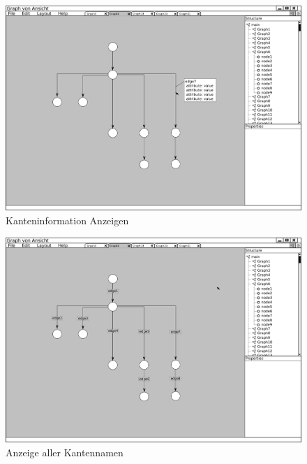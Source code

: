 \begin{figure}[ht]
  \centering
  \includegraphics[width=380pt]{resourcen/gui_view_showInfoInView_edge.png}
  \caption{Kanteninformation Anzeigen}
  \label{fig:gui_view_showInfoInView_edge}
\end{figure}

\begin{figure}[hb]
  \centering
  \includegraphics[width=380pt]{resourcen/gui_view_showInfoInView_edge_all.png}
  \caption{Anzeige aller Kantennamen}
  \label{fig:gui_view_showInfoInView_edge_all}
\end{figure}

